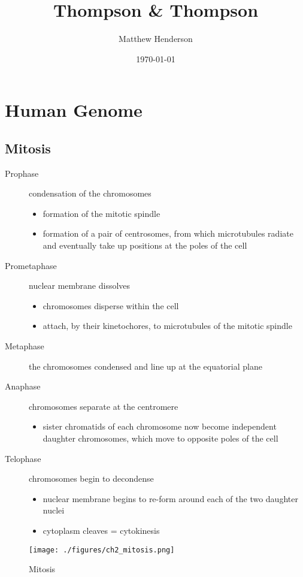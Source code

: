 \documentclass[12pt]{scrartcl}
\author{Matthew Henderson}
\date{\today}
\title{Thompson \& Thompson}
\begin{document}
\maketitle
\setcounter{tocdepth}{1}
\tableofcontents


\section{Human Genome}
\label{sec:org9155898}
\subsection{Mitosis}
\label{sec:org88b1746}
\begin{description}
\item[{Prophase}] condensation of the chromosomes
\begin{itemize}
\item formation of the mitotic spindle
\item formation of a pair of centrosomes, from which microtubules
radiate and eventually take up positions at the poles of the cell
\end{itemize}
\item[{Prometaphase}] nuclear membrane dissolves
\begin{itemize}
\item chromosomes disperse within the cell
\item attach, by their kinetochores, to microtubules of the mitotic
spindle
\end{itemize}
\item[{Metaphase}] the chromosomes condensed and line up at the equatorial
plane
\item[{Anaphase}] chromosomes separate at the centromere
\begin{itemize}
\item sister chromatids of each chromosome now become independent
daughter chromosomes, which move to opposite poles of the cell
\end{itemize}
\item[{Telophase}] chromosomes begin to decondense
\begin{itemize}
\item nuclear membrane begins to re-form around each of the two daughter
nuclei
\item cytoplasm cleaves = cytokinesis
\end{itemize}
\end{description}

\begin{figure}[htbp]
\centering
\texttt{[image: ./figures/ch2\_mitosis.png]}
\caption{\label{fig:orgaadf2d5}Mitosis}
\end{figure}
\end{document}
